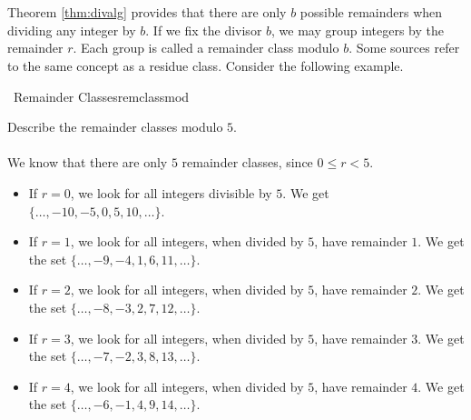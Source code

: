     \vphantom
    \\
    \\
    Theorem \ref{thm:divalg} provides that there are only \(b\) possible remainders when dividing any integer by \(b\). If we fix the divisor \(b\), we may group integers by the remainder \(r\). Each group is called a remainder class modulo \(b\). Some sources refer to the same concept as a residue class. Consider the following example.
    \begin{example}{\Difficulty\,\Difficulty\,\,Remainder Classes}{remclassmod}
    
        Describe the remainder classes modulo \(5\).
        \\
        \\
        We know that there are only \(5\) remainder classes, since \(0\leq r<5\).
        \begin{itemize}
            \item If \(r=0\), we look for all integers divisible by \(5\). We get \(\{\ldots,-10,-5,0,5,10,\ldots\}\).
        \end{itemize}
        \begin{itemize}
            \item If \(r=1\), we look for all integers, when divided by \(5\), have remainder \(1\). We get the set \(\{\ldots,-9,-4,1,6,11,\ldots\}\).
        \end{itemize}
        \begin{itemize}
            \item If \(r=2\), we look for all integers, when divided by \(5\), have remainder \(2\). We get the set \(\{\ldots,-8,-3,2,7,12,\ldots\}\).
        \end{itemize}
        \begin{itemize}
            \item If \(r=3\), we look for all integers, when divided by \(5\), have remainder \(3\). We get the set \(\{\ldots,-7,-2,3,8,13,\ldots\}\).
        \end{itemize}
        \begin{itemize}
            \item If \(r=4\), we look for all integers, when divided by \(5\), have remainder \(4\). We get the set \(\{\ldots,-6,-1,4,9,14,\ldots\}\).
        \end{itemize}
        
    \end{example}
    \vphantom
    \\
    \\
